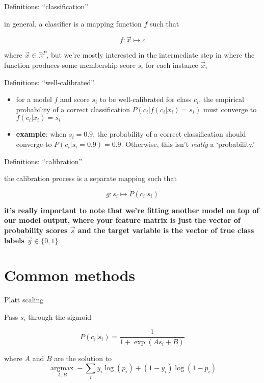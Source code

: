 \documentclass[ignorenonframetext,]{beamer}
\providecommand{\tightlist}{%
\setlength{\itemsep}{0pt}\setlength{\parskip}{0pt}}
\begin{document}
\begin{frame}{Definitions: ``classification''}

in general, a classifier is a mapping function \(f\) such that

\[f: \vec{x} \mapsto c\]

where \(\vec{x} \in \mathbb{R}^{P}\), but we're mostly interested in the
intermediate step in where the function produces some membership score
\(s_i\) for each instance \(\vec{x}_i\)

\end{frame}

\begin{frame}{Definitions: ``well-calibrated''}

\begin{itemize}
\tightlist
\item
  for a model \(f\) and score \(s_i\) to be well-calibrated for class
  \(c_i\), the empirical probability of a correct classification
  \(P(c_i | f( c_i | x_i)=s_i)\) must converge to \(f(c_i | x_i) = s_i\)
  \vspace{5mm}
\item
  \textbf{example}: when \(s_i = 0.9\), the probability of a correct
  classification should converge to \(P(c_i | s_i = 0.9) = 0.9\).
  Otherwise, this isn't \textit{really} a `probability.'
\end{itemize}

\end{frame}

\begin{frame}{Definitions: ``calibration''}

the calibration process is a separate mapping such that

\[g: s_i \mapsto P(c_i | s_i)\]

\textbf{it's really important to note that we're fitting another model
on top of our model output, where your feature matrix is just the vector
of probability scores \(\vec{s}\) and the target variable is the vector
of true class labels \(\vec{y} \in \{0,1\}\)}

\end{frame}

\section{Common methods}\label{common-methods}

\begin{frame}{Platt scaling}

Pass \(s_i\) through the sigmoid

\[P(c_i | s_i) = \frac{1}{1 + \exp(As_i + B)}\]

where \(A\) and \(B\) are the solution to
\[\underset{A, B}{\operatorname{argmax}} - \sum\limits_{i} y_i \log(p_i) + (1 - y_i) \log(1- p_i)\]

\end{frame}
\end{document}
